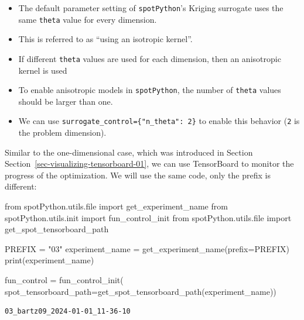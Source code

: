 \documentclass[
  letterpaper,
  DIV=11,
  numbers=noendperiod]{scrreprt}
\newenvironment{Shaded}{\begin{snugshade}}{\end{snugshade}}
\newcommand{\BuiltInTok}[1]{\textcolor[rgb]{0.00,0.23,0.31}{#1}}
\newcommand{\ImportTok}[1]{\textcolor[rgb]{0.00,0.46,0.62}{#1}}
\newcommand{\NormalTok}[1]{\textcolor[rgb]{0.00,0.23,0.31}{#1}}
\newcommand{\OperatorTok}[1]{\textcolor[rgb]{0.37,0.37,0.37}{#1}}
\newcommand{\StringTok}[1]{\textcolor[rgb]{0.13,0.47,0.30}{#1}}
\providecommand{\tightlist}{%
  \setlength{\itemsep}{0pt}\setlength{\parskip}{0pt}}\usepackage{longtable,booktabs,array}
\begin{document}
\begin{itemize}
\tightlist
\item
  The default parameter setting of \texttt{spotPython}'s Kriging
  surrogate uses the same \texttt{theta} value for every dimension.
\item
  This is referred to as ``using an isotropic kernel''.
\item
  If different \texttt{theta} values are used for each dimension, then
  an anisotropic kernel is used
\item
  To enable anisotropic models in \texttt{spotPython}, the number of
  \texttt{theta} values should be larger than one.
\item
  We can use \texttt{surrogate\_control=\{"n\_theta":\ 2\}} to enable
  this behavior (\texttt{2} is the problem dimension).
\end{itemize}

\begin{tcolorbox}[enhanced jigsaw, opacityback=0, left=2mm, title=\textcolor{quarto-callout-note-color}{\faInfo}\hspace{0.5em}{TensorBoard}, bottomrule=.15mm, titlerule=0mm, arc=.35mm, leftrule=.75mm, colbacktitle=quarto-callout-note-color!10!white, bottomtitle=1mm, opacitybacktitle=0.6, coltitle=black, colframe=quarto-callout-note-color-frame, toprule=.15mm, breakable, colback=white, toptitle=1mm, rightrule=.15mm]

Similar to the one-dimensional case, which was introduced in Section
Section~\ref{sec-visualizing-tensorboard-01}, we can use TensorBoard to
monitor the progress of the optimization. We will use the same code,
only the prefix is different:

\begin{Shaded}
\begin{Highlighting}[]
\ImportTok{from}\NormalTok{ spotPython.utils.}\BuiltInTok{file} \ImportTok{import}\NormalTok{ get\_experiment\_name}
\ImportTok{from}\NormalTok{ spotPython.utils.init }\ImportTok{import}\NormalTok{ fun\_control\_init}
\ImportTok{from}\NormalTok{ spotPython.utils.}\BuiltInTok{file} \ImportTok{import}\NormalTok{ get\_spot\_tensorboard\_path}

\NormalTok{PREFIX }\OperatorTok{=} \StringTok{"03"}
\NormalTok{experiment\_name }\OperatorTok{=}\NormalTok{ get\_experiment\_name(prefix}\OperatorTok{=}\NormalTok{PREFIX)}
\BuiltInTok{print}\NormalTok{(experiment\_name)}

\NormalTok{fun\_control }\OperatorTok{=}\NormalTok{ fun\_control\_init(}
\NormalTok{    spot\_tensorboard\_path}\OperatorTok{=}\NormalTok{get\_spot\_tensorboard\_path(experiment\_name))}
\end{Highlighting}
\end{Shaded}

\begin{verbatim}
03_bartz09_2024-01-01_11-36-10
\end{verbatim}

\end{tcolorbox}
\end{document}
